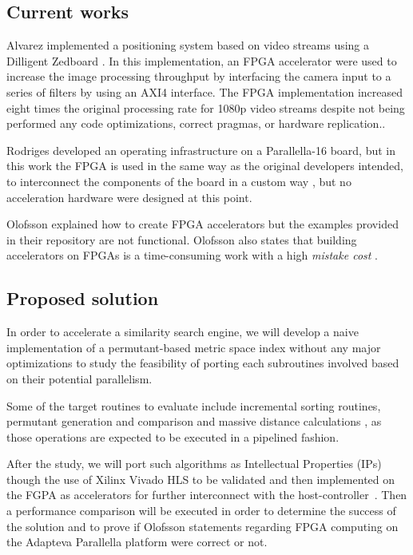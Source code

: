 \documentclass[11pt,letterpaper]{article}
\begin{document}
\subsection{Current works} 
    Alvarez \cite{SPA_thesis} implemented a positioning system based on video streams using a Dilligent Zedboard 
    \cite{DILLIGENT_zedboard_reference}. In this implementation, an FPGA accelerator were used to increase the 
    image processing throughput by interfacing the camera input to a series of filters by using an AXI4 interface.
    The FPGA implementation increased eight times the original processing rate for 1080p video streams despite not 
    being performed any code optimizations, correct pragmas, or hardware replication.\cite{XILINX_hls_ultrafast}.

    Rodriges \cite{BR_thesis} developed an operating infrastructure on a Parallella-16 board, but in this work
    the FPGA is used in the same way as the original developers intended, to interconnect the components of the
    board in a custom way \cite{DBLP:journals/corr/OlofssonNZ14}, but no acceleration hardware were designed at this
    point.

    Olofsson \cite{PARALLELLA_accelerator} explained how to create FPGA accelerators but the examples provided
    in their repository are not functional. Olofsson also states that building accelerators on FPGAs is a
    time-consuming work with a high \emph{mistake cost} \cite{PARALLELLA_accelerator}. 
    
\subsection{Proposed solution}
    In order to accelerate a similarity search engine, we will develop a naive implementation of a 
    permutant-based metric space index without any major optimizations to study the feasibility of porting
    each subroutines involved based on their potential parallelism.

    Some of the target routines to evaluate include incremental sorting routines\cite{7416566}, permutant generation 
    and comparison\cite{5271946} and massive distance calculations \cite{5271944,5271946}, as those operations
    are expected to be executed in a pipelined fashion.

    After the study, we will port such algorithms as Intellectual Properties (IPs) though the use of Xilinx Vivado 
    HLS to be validated and then implemented on the FGPA as accelerators for further interconnect with the 
    host-controller \cite{SPA_thesis, XILINX_hls_design_guide, XILINX_hls_reference, XILINX_software_guide, 
    XILINX_hls_design_tuto, XILINX_hls_ultrafast}. Then a performance comparison will be executed in order to 
    determine the success of the solution and to prove if Olofsson statements regarding FPGA computing
    \cite{PARALLELLA_accelerator} on the Adapteva Parallella platform were correct or not.
\end{document}
